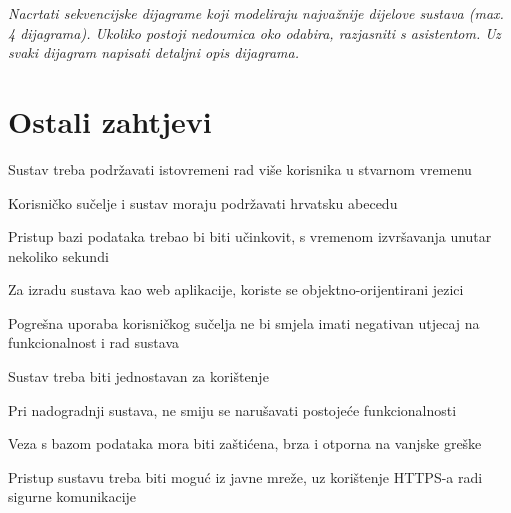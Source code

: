 				\textit{Nacrtati sekvencijske dijagrame koji modeliraju najvažnije dijelove sustava (max. 4 dijagrama). Ukoliko postoji nedoumica oko odabira, razjasniti s asistentom. Uz svaki dijagram napisati detaljni opis dijagrama.}
				\eject
	
		\section{Ostali zahtjevi}

		\begin{packed_item}
			\item Sustav treba podržavati istovremeni rad više korisnika u stvarnom vremenu
			\item Korisničko sučelje i sustav moraju podržavati hrvatsku abecedu 
			\item Pristup bazi podataka trebao bi biti učinkovit, s vremenom izvršavanja unutar nekoliko sekundi
			\item Za izradu sustava kao web aplikacije, koriste se objektno-orijentirani jezici
			\item Pogrešna uporaba korisničkog sučelja ne bi smjela imati negativan utjecaj na funkcionalnost i rad sustava
			\item Sustav treba biti jednostavan za korištenje
			\item Pri nadogradnji sustava, ne smiju se narušavati postojeće funkcionalnosti
			\item Veza s bazom podataka mora biti zaštićena, brza i otporna na vanjske greške
			\item Pristup sustavu treba biti moguć iz javne mreže, uz korištenje HTTPS-a radi sigurne komunikacije
		\end{packed_item}
	